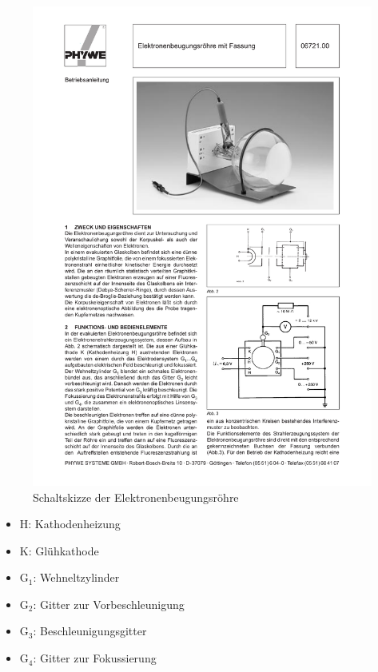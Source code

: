\documentclass[12pt,a4paper]{article}
\begin{document}
\begin{figure}[H] 
  \centering
    \includegraphics[trim = 105mm 47mm 10mm 178mm, clip, scale = 1]{beugungsroehre.pdf}
  	\caption[Schaltskizze der Elektronenbeugungsröhre]{Schaltskizze der Elektronenbeugungsröhre\footnotemark}
  \label{fig:aufbau_h}
\end{figure}


\begin{itemize}
\item	H:		Kathodenheizung 

\item	K:		Glühkathode

\item	G$_1$:	Wehneltzylinder 

\item	G$_2$:	Gitter zur Vorbeschleunigung

\item	G$_3$:	Beschleunigungsgitter

\item	G$_4$:	Gitter zur Fokussierung
\end{itemize}
\end{document}

